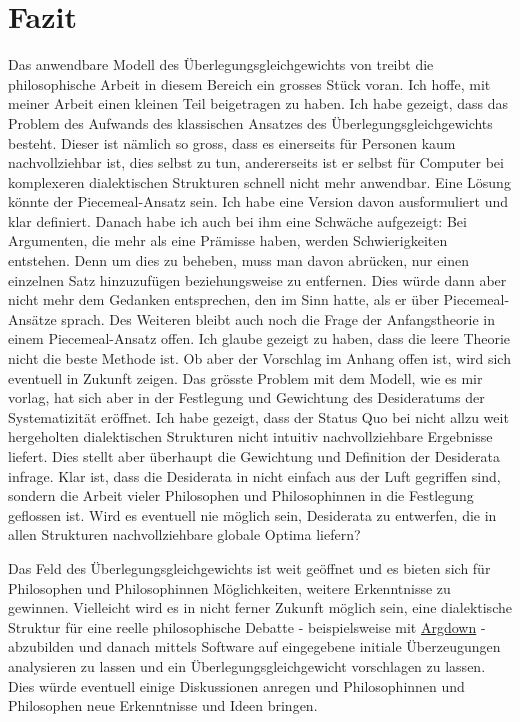 \documentclass{article}
\begin{document}
\section{Fazit}
Das anwendbare Modell des Überlegungsgleichgewichts von \citeauthor{beisbart_making_2021} treibt die philosophische Arbeit in diesem Bereich ein grosses Stück voran. Ich hoffe, mit meiner Arbeit einen kleinen Teil beigetragen zu haben. Ich habe gezeigt, dass das Problem des Aufwands des klassischen Ansatzes des Überlegungsgleichgewichts besteht. Dieser ist nämlich so gross, dass es einerseits für Personen kaum nachvollziehbar ist, dies selbst zu tun, andererseits ist er selbst für Computer bei komplexeren dialektischen Strukturen schnell nicht mehr anwendbar. Eine Lösung könnte der Piecemeal-Ansatz sein. Ich habe eine Version davon ausformuliert und klar definiert. Danach habe ich auch bei ihm eine Schwäche aufgezeigt: Bei Argumenten, die mehr als eine Prämisse haben, werden Schwierigkeiten entstehen. Denn um dies zu beheben, muss man davon abrücken, nur einen einzelnen Satz hinzuzufügen beziehungsweise zu entfernen. Dies würde dann aber nicht mehr dem Gedanken entsprechen, den \autocite{goodman_fact_1983} im Sinn hatte, als er über Piecemeal-Ansätze sprach. Des Weiteren bleibt auch noch die Frage der Anfangstheorie in einem Piecemeal-Ansatz offen. Ich glaube gezeigt zu haben, dass die leere Theorie nicht die beste Methode ist. Ob aber der Vorschlag im Anhang offen ist, wird sich eventuell in Zukunft zeigen.
Das grösste Problem mit dem Modell, wie es mir vorlag, hat sich aber in der Festlegung und Gewichtung des Desideratums der Systematizität eröffnet. Ich habe gezeigt, dass der Status Quo bei nicht allzu weit hergeholten dialektischen Strukturen nicht intuitiv nachvollziehbare Ergebnisse liefert. Dies stellt aber überhaupt die Gewichtung und Definition der Desiderata infrage. Klar ist, dass die Desiderata in \autocite{beisbart_making_2021} nicht einfach aus der Luft gegriffen sind, sondern die Arbeit vieler Philosophen und Philosophinnen in die Festlegung geflossen ist. Wird es eventuell nie möglich sein, Desiderata zu entwerfen, die in allen Strukturen nachvollziehbare globale Optima liefern?

Das Feld des Überlegungsgleichgewichts ist weit geöffnet und es bieten sich für Philosophen und Philosophinnen Möglichkeiten, weitere Erkenntnisse zu gewinnen. Vielleicht wird es in nicht ferner Zukunft möglich sein, eine dialektische Struktur für eine reelle philosophische Debatte - beispielsweise mit \href{https://argdown.org/}{Argdown} - abzubilden und danach mittels Software auf eingegebene initiale Überzeugungen analysieren zu lassen und ein Überlegungsgleichgewicht vorschlagen zu lassen. Dies würde eventuell einige Diskussionen anregen und Philosophinnen und Philosophen neue Erkenntnisse und Ideen bringen.
\end{document}
